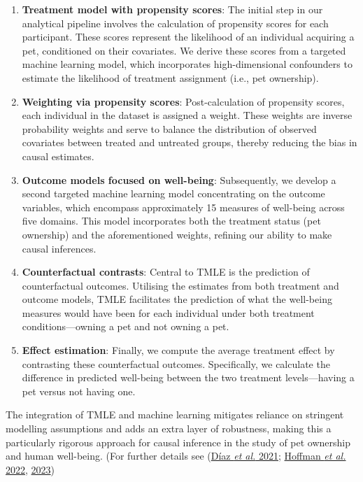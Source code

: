 \documentclass[
  singlecolumn,
  9pt]{article}
\begin{document}
\begin{enumerate}
\def\labelenumi{\arabic{enumi}.}
\item
  \textbf{Treatment model with propensity scores}: The initial step in
  our analytical pipeline involves the calculation of propensity scores
  for each participant. These scores represent the likelihood of an
  individual acquiring a pet, conditioned on their covariates. We derive
  these scores from a targeted machine learning model, which
  incorporates high-dimensional confounders to estimate the likelihood
  of treatment assignment (i.e., pet ownership).
\item
  \textbf{Weighting via propensity scores}: Post-calculation of
  propensity scores, each individual in the dataset is assigned a
  weight. These weights are inverse probability weights and serve to
  balance the distribution of observed covariates between treated and
  untreated groups, thereby reducing the bias in causal estimates.
\item
  \textbf{Outcome models focused on well-being}: Subsequently, we
  develop a second targeted machine learning model concentrating on the
  outcome variables, which encompass approximately 15 measures of
  well-being across five domains. This model incorporates both the
  treatment status (pet ownership) and the aforementioned weights,
  refining our ability to make causal inferences.
\item
  \textbf{Counterfactual contrasts}: Central to TMLE is the prediction
  of counterfactual outcomes. Utilising the estimates from both
  treatment and outcome models, TMLE facilitates the prediction of what
  the well-being measures would have been for each individual under both
  treatment conditions---owning a pet and not owning a pet.
\item
  \textbf{Effect estimation}: Finally, we compute the average treatment
  effect by contrasting these counterfactual outcomes. Specifically, we
  calculate the difference in predicted well-being between the two
  treatment levels---having a pet versus not having one.
\end{enumerate}

The integration of TMLE and machine learning mitigates reliance on
stringent modelling assumptions and adds an extra layer of robustness,
making this a particularly rigorous approach for causal inference in the
study of pet ownership and human well-being. (For further details see
(\hyperref[ref-duxedaz2021]{Díaz \emph{et al.} 2021};
\hyperref[ref-hoffman2022]{Hoffman \emph{et al.} 2022},
\hyperref[ref-hoffman2023]{2023})
\end{document}

